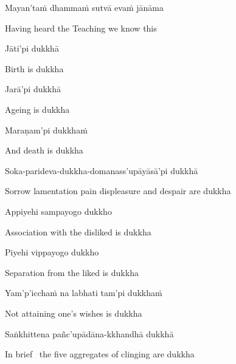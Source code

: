Mayan'taṁ dhammaṁ sutvā evaṁ jānāma

\begin{english}
  Having heard the Teaching we know this
\end{english}

\suttaRef{[Thai]}

Jāti'pi dukkhā

\begin{english}
  Birth is dukkha
\end{english}

Jarā'pi dukkhā

\begin{english}
  Ageing is dukkha
\end{english}

Maraṇam'pi dukkhaṁ

\begin{english}
  And death is dukkha
\end{english}

Soka-parideva-dukkha-domanass'upāyāsā'pi dukkhā

\begin{english}
  Sorrow lamentation pain displeasure\ifdigitalversion\makeatletter\hyperlink{endnote14-appendix}\makeatother\fi
  and despair are dukkha
\end{english}

Appiyehi sampayogo dukkho

\begin{english}
  Association with the disliked is dukkha
\end{english}

Piyehi vippayogo dukkho

\begin{english}
  Separation from the liked is dukkha
\end{english}

\ifbsixversion\clearpage\fi

Yam'p'icchaṁ na labhati tam'pi dukkhaṁ

\begin{english}
  Not attaining one's wishes is dukkha
\end{english}

\suttaRef{[MN 10]}

Saṅkhittena pañc'upādāna-kkhandhā dukkhā

\begin{english}
  In brief \breathmark\ the five aggregates of clinging are dukkha\ifdigitalversion\makeatletter\hyperlink{endnote15-appendix}\makeatother\fi
\end{english}

